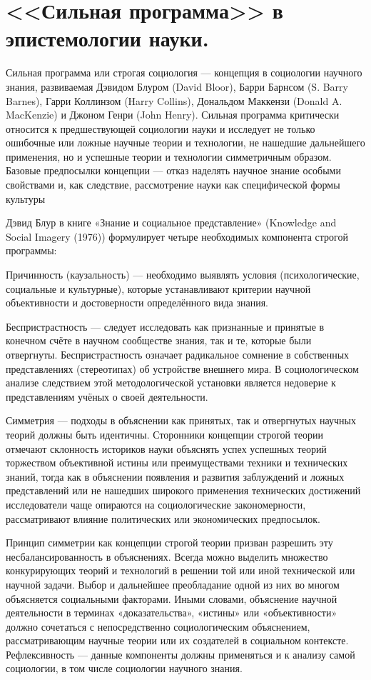 \documentclass[12pt, specialist, subf, substylefile = spbu.rtx]{disser}
\begin{document}
\section{<<Сильная программа>> в эпистемологии науки.}
Сильная программа или строгая социология — концепция в социологии научного знания, развиваемая Дэвидом Блуром (David Bloor), Барри Барнсом (S. Barry Barnes), Гарри Коллинзом (Harry Collins), Дональдом Маккензи (Donald A. MacKenzie) и Джоном Генри (John Henry). Сильная программа критически относится к предшествующей социологии науки и исследует не только ошибочные или ложные научные теории и технологии, не нашедшие дальнейшего применения, но и успешные теории и технологии симметричным образом. Базовые предпосылки концепции — отказ наделять научное знание особыми свойствами и, как следствие, рассмотрение науки как специфической формы культуры

Дэвид Блур в книге «Знание и социальное представление» (Knowledge and Social Imagery (1976)) формулирует четыре необходимых компонента строгой программы:

Причинность (каузальность) — необходимо выявлять условия (психологические, социальные и культурные), которые устанавливают критерии научной объективности и достоверности определённого вида знания.

Беспристрастность — следует исследовать как признанные и принятые в конечном счёте в научном сообществе знания, так и те, которые были отвергнуты. Беспристрастность означает радикальное сомнение в собственных представлениях (стереотипах) об устройстве внешнего мира. В социологическом анализе следствием этой методологической установки является недоверие к представлениям учёных о своей деятельности.

Симметрия — подходы в объяснении как принятых, так и отвергнутых научных теорий должны быть идентичны. Сторонники концепции строгой теории отмечают склонность историков науки объяснять успех успешных теорий торжеством объективной истины или преимуществами техники и технических знаний, тогда как в объяснении появления и развития заблуждений и ложных представлений или не нашедших широкого применения технических достижений исследователи чаще опираются на социологические закономерности, рассматривают влияние политических или экономических предпосылок. 

Принцип симметрии как концепции строгой теории призван разрешить эту несбалансированность в объяснениях. Всегда можно выделить множество конкурирующих теорий и технологий в решении той или иной технической или научной задачи. Выбор и дальнейшее преобладание одной из них во многом объясняется социальными факторами. Иными словами, объяснение научной деятельности в терминах «доказательства», «истины» или «объективности» должно сочетаться с непосредственно социологическим объяснением, рассматривающим научные теории или их создателей в социальном контексте.
Рефлексивность — данные компоненты должны применяться и к анализу самой социологии, в том числе социологии научного знания.
\end{document}
